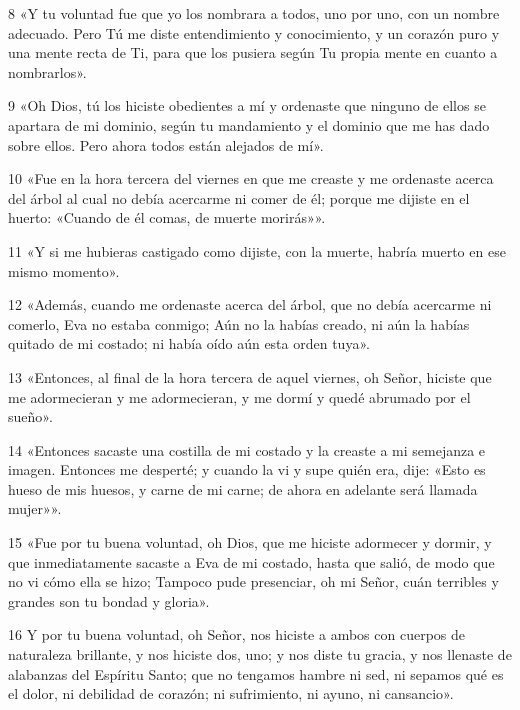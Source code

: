 \par 8 «Y tu voluntad fue que yo los nombrara a todos, uno por uno, con un nombre adecuado. Pero Tú me diste entendimiento y conocimiento, y un corazón puro y una mente recta de Ti, para que los pusiera según Tu propia mente en cuanto a nombrarlos».

\par 9 «Oh Dios, tú los hiciste obedientes a mí y ordenaste que ninguno de ellos se apartara de mi dominio, según tu mandamiento y el dominio que me has dado sobre ellos. Pero ahora todos están alejados de mí».

\par 10 «Fue en la hora tercera del viernes en que me creaste y me ordenaste acerca del árbol al cual no debía acercarme ni comer de él; porque me dijiste en el huerto: «Cuando de él comas, de muerte morirás»».

\par 11 «Y si me hubieras castigado como dijiste, con la muerte, habría muerto en ese mismo momento».

\par 12 «Además, cuando me ordenaste acerca del árbol, que no debía acercarme ni comerlo, Eva no estaba conmigo; Aún no la habías creado, ni aún la habías quitado de mi costado; ni había oído aún esta orden tuya».

\par 13 «Entonces, al final de la hora tercera de aquel viernes, oh Señor, hiciste que me adormecieran y me adormecieran, y me dormí y quedé abrumado por el sueño».

\par 14 «Entonces sacaste una costilla de mi costado y la creaste a mi semejanza e imagen. Entonces me desperté; y cuando la vi y supe quién era, dije: «Esto es hueso de mis huesos, y carne de mi carne; de ahora en adelante será llamada mujer»».

\par 15 «Fue por tu buena voluntad, oh Dios, que me hiciste adormecer y dormir, y que inmediatamente sacaste a Eva de mi costado, hasta que salió, de modo que no vi cómo ella se hizo; Tampoco pude presenciar, oh mi Señor, cuán terribles y grandes son tu bondad y gloria».

\par 16 Y por tu buena voluntad, oh Señor, nos hiciste a ambos con cuerpos de naturaleza brillante, y nos hiciste dos, uno; y nos diste tu gracia, y nos llenaste de alabanzas del Espíritu Santo; que no tengamos hambre ni sed, ni sepamos qué es el dolor, ni debilidad de corazón; ni sufrimiento, ni ayuno, ni cansancio».

